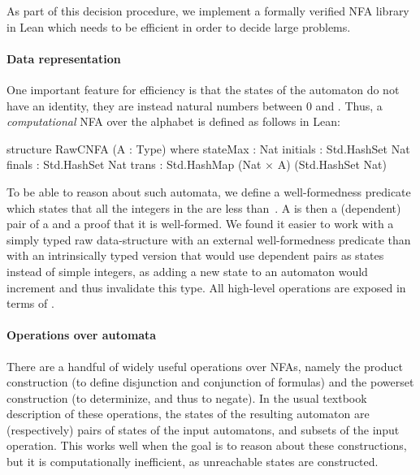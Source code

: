 As part of this decision procedure, we implement a formally verified NFA library
in Lean which needs to be efficient in order to decide large problems.

\paragraph{Data representation}

One important feature for efficiency is that the states of the automaton do not
have an identity, they are instead natural numbers between 0 and
. Thus, a \emph{computational} NFA over the alphabet
 is defined as follows in Lean:

\begin{lean}
  structure RawCNFA (A : Type) where
    stateMax : Nat
    initials : Std.HashSet Nat
    finals   : Std.HashSet Nat
    trans    : Std.HashMap (Nat × A) (Std.HashSet Nat)
\end{lean}

To be able to reason about such automata, we define a well-formedness predicate
 which states that all the integers in the
 are less than~.
%
A  is then a (dependent) pair of a  and a
proof that it is well-formed.
%
We found it easier to work with a simply typed raw data-structure with an
external well-formedness predicate than with an intrinsically typed version that
would use dependent pairs  as states
instead of simple integers, as adding a new state to an automaton would
increment  and thus invalidate this type.
%
All high-level operations are exposed in terms of
.

\paragraph{Operations over automata}

There are a handful of widely useful operations over NFAs, namely the product
construction (to define disjunction and conjunction of formulas) and the
powerset construction (to determinize, and thus to negate).
%
In the usual textbook description of these operations, the states of the
resulting automaton are (respectively) pairs of states of the input automatons,
and subsets of the input operation. This works well when the goal is to reason
about these constructions, but it is computationally inefficient, as
unreachable states are constructed.

